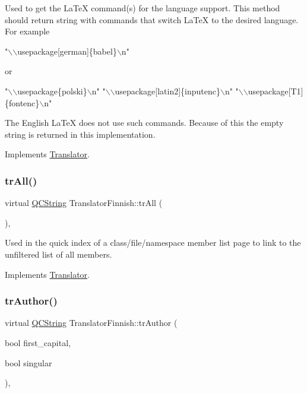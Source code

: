 Used to get the La\+TeX command(s) for the language support. This method should return string with commands that switch La\+TeX to the desired language. For example 
\begin{DoxyPre}"\(\backslash\)\(\backslash\)usepackage[german]\{babel\}\(\backslash\)n"
 \end{DoxyPre}
 or 
\begin{DoxyPre}"\(\backslash\)\(\backslash\)usepackage\{polski\}\(\backslash\)n"
 "\(\backslash\)\(\backslash\)usepackage[latin2]\{inputenc\}\(\backslash\)n"
 "\(\backslash\)\(\backslash\)usepackage[T1]\{fontenc\}\(\backslash\)n"
 \end{DoxyPre}


The English La\+TeX does not use such commands. Because of this the empty string is returned in this implementation. 

Implements \mbox{\hyperlink{class_translator}{Translator}}.

\mbox{\label{class_translator_finnish_ab2b5bd969d63784e657ed8118bb0f63d}} 
\subsubsection{\texorpdfstring{trAll()}{trAll()}}
{\footnotesize\ttfamily virtual \mbox{\hyperlink{class_q_c_string}{Q\+C\+String}} Translator\+Finnish\+::tr\+All (\begin{DoxyParamCaption}{ }\end{DoxyParamCaption})\hspace{0.3cm}{\ttfamily [inline]}, {\ttfamily [virtual]}}

Used in the quick index of a class/file/namespace member list page to link to the unfiltered list of all members. 

Implements \mbox{\hyperlink{class_translator}{Translator}}.

\mbox{\label{class_translator_finnish_ad53852c23a27b77aa025a56dba848253}} 
\subsubsection{\texorpdfstring{trAuthor()}{trAuthor()}}
{\footnotesize\ttfamily virtual \mbox{\hyperlink{class_q_c_string}{Q\+C\+String}} Translator\+Finnish\+::tr\+Author (\begin{DoxyParamCaption}\item[{bool}]{first\+\_\+capital,  }\item[{bool}]{singular }\end{DoxyParamCaption})\hspace{0.3cm}{\ttfamily [inline]}, {\ttfamily [virtual]}}

